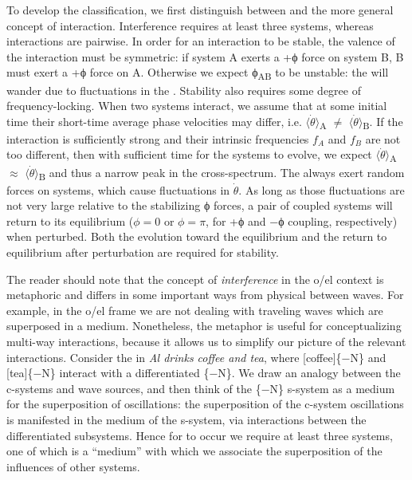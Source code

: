   To develop the classification, we first distinguish between  and the more general concept of interaction. Interference requires at least three systems, whereas interactions are pairwise. In order for an interaction to be stable, the valence of the interaction must be symmetric: if system A exerts a +ϕ force on system B, B must exert a +ϕ force on A. Otherwise we expect ϕ\textsubscript{AB} to be unstable: the  will wander due to fluctuations in the . Stability also requires some degree of frequency-locking. When two systems interact, we assume that at some initial time their short-time average phase velocities may differ, i.e. $\langle\dot{\theta}\rangle$\textsubscript{A} ${\neq}$ $\langle\dot{\theta}\rangle$\textsubscript{B}. If the interaction is sufficiently strong and their intrinsic frequencies $f_A$ and $f_B$ are not too different, then with sufficient time for the systems to evolve, we expect $\langle\dot{\theta}\rangle$\textsubscript{A} ${\approx}$ $\langle\dot{\theta}\rangle$\textsubscript{B} and thus a narrow peak in the cross-spectrum. The  always exert random forces on systems, which cause fluctuations in  $\dot{\theta}$. As long as those fluctuations are not very large relative to the stabilizing ϕ forces, a pair of coupled systems will return to its equilibrium ($ϕ=0$ or $ϕ=π$, for +ϕ and −ϕ coupling, respectively) when perturbed. Both the evolution toward the equilibrium and the return to equilibrium after perturbation are required for stability.

  The reader should note that the concept of \textit{interference} in the o/el context is metaphoric and differs in some important ways from physical  between waves. For example, in the o/el frame we are not dealing with traveling waves which are superposed in a medium. Nonetheless, the metaphor is useful for conceptualizing multi-way interactions, because it allows us to simplify our picture of the relevant interactions. Consider the  in \textit{Al drinks coffee and tea}, where [coffee]\{−N\} and [tea]\{−N\} interact with a differentiated \{−N\}. We draw an analogy between the c-systems and wave sources, and then think of the \{−N\} s-system as a medium for the superposition of oscillations: the superposition of the c-system oscillations is manifested in the medium of the s-system, via interactions between the differentiated subsystems. Hence for  to occur we require at least three systems, one of which is a “medium” with which we associate the superposition of the influences of other systems. 

